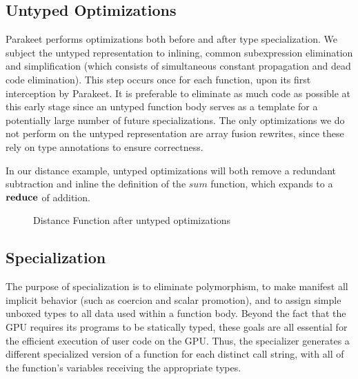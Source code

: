 \documentclass[preprint]{sigplanconf}
\begin{document}
\subsection{Untyped Optimizations}
Parakeet performs optimizations both before and after type specialization. We subject the untyped representation to inlining, common subexpression elimination and simplification (which consists of simultaneous constant propagation and dead code elimination). This step occurs once for each function, upon its first interception by Parakeet. It is preferable to eliminate as much code as possible at this early stage since an untyped function body serves as a template for a potentially large number of future specializations. The only optimizations we do not perform on the untyped representation are array fusion rewrites, since these rely on type annotations to ensure correctness.

In our distance example, untyped optimizations will both remove a redundant subtraction and inline the definition of the $sum$ function, which expands to a $\mbox{\textbf{reduce}}$ of addition.
\begin{figure}[h!]
\caption{Distance Function after untyped optimizations}
\end{figure}

\subsection{Specialization}
The purpose of specialization is to eliminate polymorphism, to make manifest all implicit behavior (such as coercion and scalar promotion), and to assign simple unboxed types to all data used within a function body. Beyond the fact that the GPU requires its programs to be statically typed, these goals are all essential for the efficient execution of user code on the GPU. Thus, the specializer generates a different specialized version of a function for each distinct call string, with all of the function's
variables receiving the appropriate types.
\end{document}
